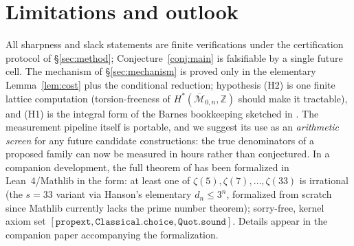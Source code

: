 \documentclass[11pt]{article}
\theoremstyle{definition}
\newcommand{\dn}[1]{d_{#1}}
\newcommand{\Z}{\mathbb{Z}}
\begin{document}
\section{Limitations and outlook}

All sharpness and slack statements are finite verifications under the
certification protocol of \S\ref{sec:method}; Conjecture~\ref{conj:main}
is falsifiable by a single future cell. The mechanism of
\S\ref{sec:mechanism} is proved only in the elementary
Lemma~\ref{lem:cost} plus the conditional reduction; hypothesis (H2) is
one finite lattice computation (torsion-freeness of
$H^\ast(\overline{\mathcal M}_{0,n},\Z)$ \cite{Keel} should make it
tractable), and (H1) is the integral form of the Barnes bookkeeping
sketched in \cite{BZ}. The measurement pipeline itself is portable, and
we suggest its use as an \emph{arithmetic screen} for any future
candidate constructions: the true denominators of a proposed family can
now be measured in hours rather than conjectured. In a companion
development, the full theorem of \cite{Zu18} has been formalized in
Lean~4/Mathlib in the form: at least one of
$\zeta(5),\zeta(7),\dots,\zeta(33)$ is irrational (the $s=33$ variant
via Hanson's elementary $\dn{n}\le3^n$, formalized from scratch since
Mathlib currently lacks the prime number theorem); sorry-free, kernel
axiom set $[\texttt{propext},\texttt{Classical.choice},
\texttt{Quot.sound}]$. Details appear in the companion paper
accompanying the formalization.
\end{document}
